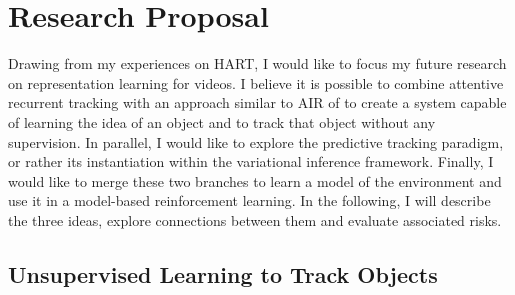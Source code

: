 \section{Research Proposal}
\label{sec:proposal}


Drawing from my experiences on HART, I would like to focus my future research on representation learning for videos. I believe it is possible to combine attentive recurrent tracking with an approach similar to AIR of \cite{Eslami2016} to create a system capable of learning the idea of an object and to track that object without any supervision. In parallel, I would like to explore the predictive tracking paradigm, or rather its instantiation within the variational inference framework. Finally, I would like to merge these two branches to learn a model of the environment and use it in a model-based reinforcement learning. In the following, I will describe the three ideas, explore connections between them and evaluate associated risks.

\subsection{Unsupervised Learning to Track Objects}
\label{sec:obj}

